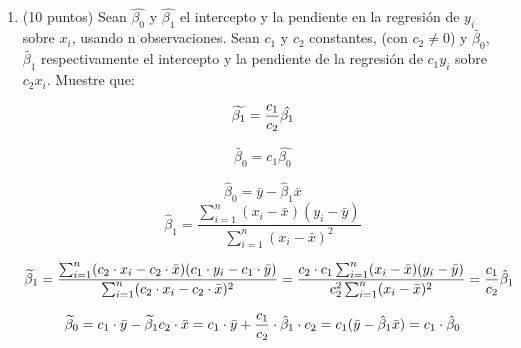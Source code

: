 \documentclass[10pt,a4paper]{article}
\begin{document}
\begin{enumerate}
\item (10 puntos) Sean $\hat{\beta_0}$  y  $\hat{\beta_1}$  el intercepto y la pendiente en la regresión de $y_i$ sobre $x_i$, usando n observaciones.
Sean $c_1$ y $c_2$ constantes, (con $c_2\neq 0$)  y $\widetilde{\beta_0}$, $\widetilde{\beta_1}$ 
 respectivamente el intercepto y la pendiente de la
regresión de $c_1y_i$ sobre $c_2x_i$. Muestre que:

$$\widetilde{\beta_1}={c_1\over c_2}\hat{\beta_1}$$

 $$\widetilde{\beta_0}=c_1\hat{\beta_0}$$

{\color{red}
$$\hat{\beta}_0 = \bar{y} - \hat{\beta}_1 \bar{x} $$
$$\hat{\beta}_1 = \frac{\sum_{i=1}^{n}(x_i - \bar{x})(y_i-\bar{y})}{\sum_{i=1}^{n}(x_i - \bar{x})^2}$$


$$\widetilde{\beta}_1 = \frac{\sum_{i=1}^{n}(c_2\cdot x_i - c_2\cdot\bar{x})(c_1\cdot y_i-c_1\cdot\bar{y})}{\sum_{i=1}^{n}(c_2\cdot x_i - c_2\cdot\bar{x})^2} = \frac{c_2\cdot c_1\sum_{i=1}^{n}(x_i - \bar{x})(y_i-\bar{y})}{c_2^2\sum_{i=1}^{n}(x_i - \bar{x})^2}={ c_1 \over c_2}  \hat{\beta}_1 $$ 


$$\widetilde{\beta}_0 = c_1\cdot \bar{y} - \widetilde{\beta}_1 c_2\cdot \bar{x} =c_1\cdot \bar{y} +{ c_1 \over c_2}\cdot \hat{\beta}_1 \cdot c_2=c_1(\bar{y} - \hat{\beta}_1 \bar{x})=c_1\cdot \hat{\beta}_0$$
}









\end{enumerate}
\end{document}
